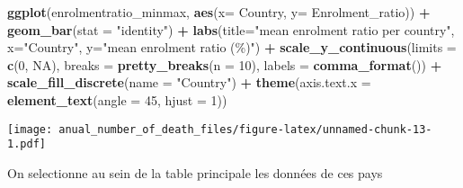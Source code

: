 \documentclass[
]{article}
\newenvironment{Shaded}{\begin{snugshade}}{\end{snugshade}}
\newcommand{\AttributeTok}[1]{\textcolor[rgb]{0.13,0.29,0.53}{#1}}
\newcommand{\ConstantTok}[1]{\textcolor[rgb]{0.56,0.35,0.01}{#1}}
\newcommand{\DecValTok}[1]{\textcolor[rgb]{0.00,0.00,0.81}{#1}}
\newcommand{\FunctionTok}[1]{\textcolor[rgb]{0.13,0.29,0.53}{\textbf{#1}}}
\newcommand{\NormalTok}[1]{#1}
\newcommand{\SpecialCharTok}[1]{\textcolor[rgb]{0.81,0.36,0.00}{\textbf{#1}}}
\newcommand{\StringTok}[1]{\textcolor[rgb]{0.31,0.60,0.02}{#1}}
\begin{document}
\begin{Shaded}
\begin{Highlighting}[]
\FunctionTok{ggplot}\NormalTok{(enrolmentratio\_minmax, }\FunctionTok{aes}\NormalTok{(}\AttributeTok{x=}\NormalTok{ Country, }\AttributeTok{y=} \StringTok{\textasciigrave{}}\AttributeTok{Enrolment\_ratio}\StringTok{\textasciigrave{}}\NormalTok{)) }\SpecialCharTok{+} \FunctionTok{geom\_bar}\NormalTok{(}\AttributeTok{stat =} \StringTok{"identity"}\NormalTok{) }\SpecialCharTok{+} \FunctionTok{labs}\NormalTok{(}\AttributeTok{title=}\StringTok{"mean enrolment ratio per country"}\NormalTok{, }\AttributeTok{x=}\StringTok{"Country"}\NormalTok{, }\AttributeTok{y=}\StringTok{"mean enrolment ratio (\%)"}\NormalTok{) }\SpecialCharTok{+} \FunctionTok{scale\_y\_continuous}\NormalTok{(}\AttributeTok{limits =} \FunctionTok{c}\NormalTok{(}\DecValTok{0}\NormalTok{, }\ConstantTok{NA}\NormalTok{), }\AttributeTok{breaks =} \FunctionTok{pretty\_breaks}\NormalTok{(}\AttributeTok{n =} \DecValTok{10}\NormalTok{), }\AttributeTok{labels =} \FunctionTok{comma\_format}\NormalTok{()) }\SpecialCharTok{+} \FunctionTok{scale\_fill\_discrete}\NormalTok{(}\AttributeTok{name =} \StringTok{"Country"}\NormalTok{) }\SpecialCharTok{+} 
  \FunctionTok{theme}\NormalTok{(}\AttributeTok{axis.text.x =} \FunctionTok{element\_text}\NormalTok{(}\AttributeTok{angle =} \DecValTok{45}\NormalTok{, }\AttributeTok{hjust =} \DecValTok{1}\NormalTok{)) }
\end{Highlighting}
\end{Shaded}

\texttt{[image: anual\_number\_of\_death\_files/figure-latex/unnamed-chunk-13-1.pdf]}

On selectionne au sein de la table principale les données de ces pays
\end{document}
